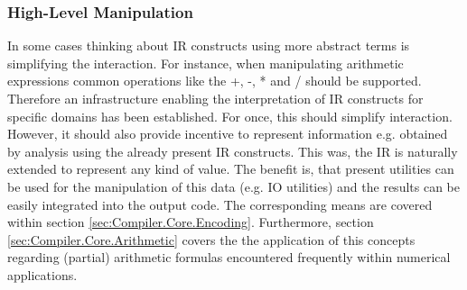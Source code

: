 \subsubsection{High-Level Manipulation}
In some cases thinking about IR constructs using more abstract terms is
simplifying the interaction. For instance, when manipulating arithmetic
expressions common operations like the +, -, * and / should be supported.
Therefore an infrastructure enabling the interpretation of IR constructs for
specific domains has been established. For once, this should simplify
interaction. However, it should also provide incentive to represent information
e.g. obtained by analysis using the already present IR constructs. This was, the
IR is naturally extended to represent any kind of value. The benefit is, that
present utilities can be used for the manipulation of this data (e.g. IO
utilities) and the results can be easily integrated into the output code. The
corresponding means are covered within section \ref{sec:Compiler.Core.Encoding}.
Furthermore, section \ref{sec:Compiler.Core.Arithmetic} covers the the
application of this concepts regarding (partial) arithmetic formulas
encountered frequently within numerical applications.
